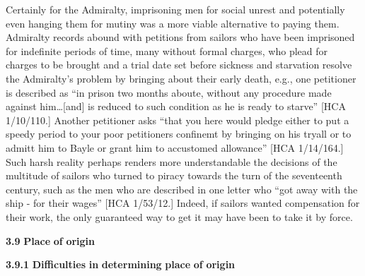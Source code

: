 Certainly for the Admiralty, imprisoning men for social unrest and potentially even hanging them for mutiny was a more viable alternative to paying them. Admiralty records abound with petitions from sailors who have been imprisoned for indefinite periods of time, many without formal charges, who plead for charges to be brought and a trial date set before sickness and starvation resolve the Admiralty’s problem by bringing about their early death, e.g., one petitioner is described as “in prison two months aboute, without any procedure made against him…[and] is reduced to such condition as he is ready to starve” [HCA 1/10/110.] Another petitioner asks “that you here would pledge either to put a speedy period to your poor petitioners confinemt by bringing on his tryall or to admitt him to Bayle or grant him to accustomed allowance” [HCA 1/14/164.] Such harsh reality perhaps renders more understandable the decisions of the multitude of sailors who turned to piracy towards the turn of the seventeenth century, such as the men who are described in one letter who “got away with the ship - for their wages” [HCA 1/53/12.] Indeed, if sailors wanted compensation for their work, the only guaranteed way to get it may have been to take it by force. 

\textbf{3.9} \textbf{Place} \textbf{of} \textbf{origin} 

\begin{styleNormali}
\textbf{3.9.1} \textbf{Difficulties} \textbf{in} \textbf{determining} \textbf{place} \textbf{of} \textbf{origin}
\end{styleNormali}

